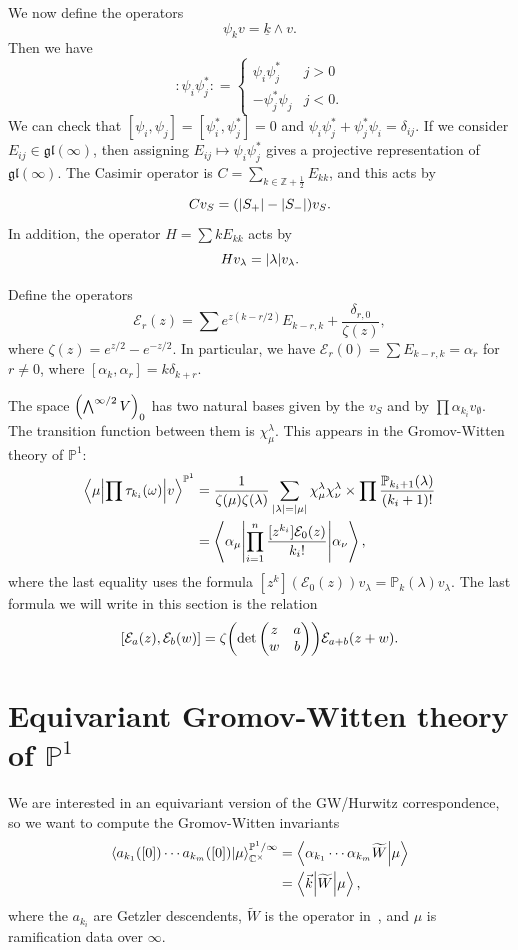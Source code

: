 \documentclass[leqno, openany]{memoir}
\theoremstyle{definition}
\theoremstyle{remark}
\theoremstyle{plain}
\theoremstyle{definition}
\theoremstyle{remark}
\newcommand{\C}{\mathbb{C}}
\newcommand{\Z}{\mathbb{Z}}
\renewcommand{\P}{\mathbb{P}}
\newcommand{\mc}[1]{\mathcal{#1}}
\newcommand{\mf}[1]{\mathfrak{#1}}
\newcommand{\ul}[1]{\underline{#1}}
\newcommand{\wt}[1]{\widetilde{#1}}
\begin{document}
We now define the operators
\[ \psi_k v = \ul{k} \wedge v. \]
Then we have
\[ :\psi_i \psi_j^*: = \begin{cases}
    \psi_i \psi_j^* & j > 0 \\
    - \psi_j^* \psi_j & j < 0.
\end{cases}
\]
We can check that $[\psi_i, \psi_j] = [\psi_i^*, \psi_j^*] = 0$ and $\psi_i \psi_j^* + \psi_j^* \psi_i = \delta_{ij}$. If we consider $E_{ij} \in \mf{gl}(\infty)$, then assigning $E_{ij} \mapsto \psi_i \psi_j^*$ gives a projective representation of $\mf{gl}(\infty)$. The Casimir operator is $C = \sum_{k \in \Z + \frac{1}{2}} E_{kk}$, and this acts by
\[ C v_S = (\abs{S_+} - \abs{S_-}) v_S. \]
In addition, the operator $H = \sum k E_{kk}$ acts by 
\[ H v_{\lambda} = \abs{\lambda} v_{\lambda}. \]

Define the operators
\[ \mc{E}_r(z) = \sum e^{z(k-r/2)} E_{k-r,k} + \frac{\delta_{r,0}}{\zeta(z)}, \]
where $\zeta(z) = e^{z/2} - e^{-z/2}$. In particular, we have $\mc{E}_r(0) = \sum E_{k-r, k} = \alpha_r$ for $r \neq 0$, where $[\alpha_k, \alpha_r] = k \delta_{k+r}$.

The space $\qty(\bigwedge^{\infty/2} V)_0$ has two natural bases given by the $v_S$ and by $\prod \alpha_{k_i} v_{\emptyset}$. The transition function between them is $\chi_{\mu}^{\lambda}$. This appears in the Gromov-Witten theory of $\P^1$:
\begin{align*} 
    \mel**{\mu}{\prod \tau_{k_i}(\omega)}{v}^{\P^1} &= \frac{1}{\zeta(\mu) \zeta(\lambda)} \sum_{\abs{\lambda} = \abs{\mu}} \chi_{\mu}^{\lambda} \chi_{\nu}^{\lambda} \times \prod \frac{\P_{k_i+1}(\lambda)}{(k_i+1)!} \\ 
    &= \mel**{\alpha_{\mu}}{\prod_{i=1}^n \frac{[z^{k_i}] \mc{E}_0(z)}{k_i!}}{\alpha_{\nu}},
\end{align*}
where the last equality uses the formula $[z^k](\mc{E}_0(z)) v_{\lambda} = \P_k(\lambda) v_{\lambda}$. The last formula we will write in this section is the relation
\[ [\mc{E}_a(z), \mc{E}_b(w)] = \zeta\qty(\det \mqty(z & a \\ w & b)) \mc{E}_{a+b}(z+w). \]

\section{Equivariant Gromov-Witten theory of $\P^1$}

We are interested in an equivariant version of the GW/Hurwitz correspondence, so we want to compute the Gromov-Witten invariants
\begin{align*}
    \braket{a_{k_1}([0]) \cdots a_{k_m}([0])}{\mu}^{\P^1/\infty}_{\C^{\times}} &= \braket{\alpha_{k_1} \cdots \alpha_{k_m} \wt{W}}{\mu} \\
    &= \mel**{\vec{k}}{\wt{W}}{\mu},
\end{align*}
where the $a_{k_i}$ are Getzler descendents, $\wt{W}$ is the operator in~, and $\mu$ is ramification data over $\infty$.
\end{document}
